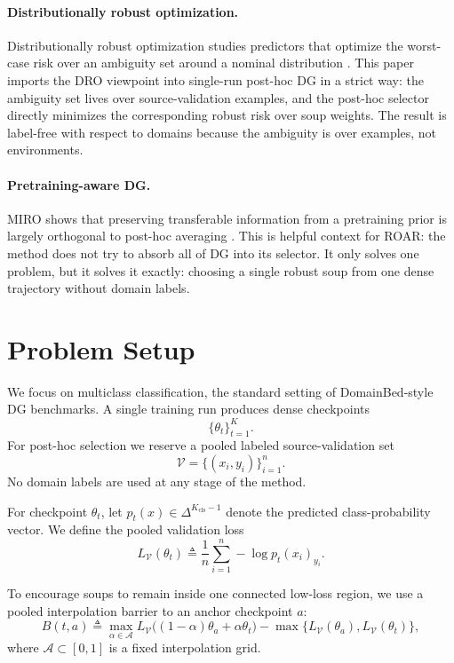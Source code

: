 \documentclass{article}
\newcommand{\cA}{\mathcal{A}}
\newcommand{\cV}{\mathcal{V}}
\newcommand{\simplex}{\Delta}
\newcommand{\roar}{\textup{\textsc{ROAR}}}
\newcommand{\miro}{\textup{\textsc{MIRO}}}
\begin{document}
\paragraph{Distributionally robust optimization.}
Distributionally robust optimization studies predictors that optimize the worst-case risk over an ambiguity set around a nominal distribution \citep{duchi2020variance,duchi2021learning}. This paper imports the DRO viewpoint into single-run post-hoc DG in a strict way: the ambiguity set lives over source-validation examples, and the post-hoc selector directly minimizes the corresponding robust risk over soup weights. The result is label-free with respect to domains because the ambiguity is over examples, not environments.

\paragraph{Pretraining-aware DG.}
\miro{} shows that preserving transferable information from a pretraining prior is largely orthogonal to post-hoc averaging \citep{cha2022miro}. This is helpful context for \roar{}: the method does not try to absorb all of DG into its selector. It only solves one problem, but it solves it exactly: choosing a single robust soup from one dense trajectory without domain labels.

\section{Problem Setup}
\label{sec:setup}

We focus on multiclass classification, the standard setting of DomainBed-style DG benchmarks. A single training run produces dense checkpoints
\[
    \{\theta_t\}_{t=1}^{K}.
\]
For post-hoc selection we reserve a pooled labeled source-validation set
\[
    \cV = \{(x_i,y_i)\}_{i=1}^{n}.
\]
No domain labels are used at any stage of the method.

For checkpoint $\theta_t$, let $p_t(x)\in\simplex^{K_{\mathrm{cls}}-1}$ denote the predicted class-probability vector. We define the pooled validation loss
\begin{equation}
    L_{\cV}(\theta_t)
    \triangleq
    \frac{1}{n}\sum_{i=1}^{n} -\log p_t(x_i)_{y_i}.
    \label{eq:val_loss}
\end{equation}

To encourage soups to remain inside one connected low-loss region, we use a pooled interpolation barrier to an anchor checkpoint $a$:
\begin{equation}
    B(t,a)
    \triangleq
    \max_{\alpha\in\cA}
    L_{\cV}\!\big((1-\alpha)\theta_a + \alpha \theta_t\big)
    -
    \max\{L_{\cV}(\theta_a), L_{\cV}(\theta_t)\},
    \label{eq:barrier}
\end{equation}
where $\cA \subset [0,1]$ is a fixed interpolation grid.
\end{document}
